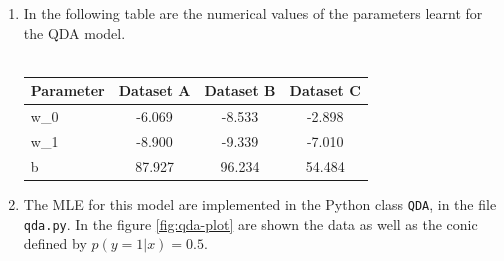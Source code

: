 \documentclass[a4paper, 11pt]{report}
\begin{document}
\begin{enumerate}[label=\alph*]
    \item In the following table are the numerical values of the parameters learnt for the QDA model. \\
    \\
        \begin{tabular}{ | l || *{3}{c| } }
             \hline
                Parameter & Dataset A & Dataset B & Dataset C \\
             \hline			
               w_0 & -6.069 & -8.533 & -2.898 \\
               w_1 & -8.900 & -9.339 & -7.010 \\
               b & 87.927 & 96.234 & 54.484 \\
             \hline  
         \end{tabular}
    
    \item The MLE for this model are implemented in the Python class \texttt{QDA}, in the file \texttt{qda.py}. In the figure \ref{fig:qda-plot} are shown the data as well as the conic defined by $p \left( y=1 | x \right) = 0.5$.
    

\end{enumerate}
\end{document}
